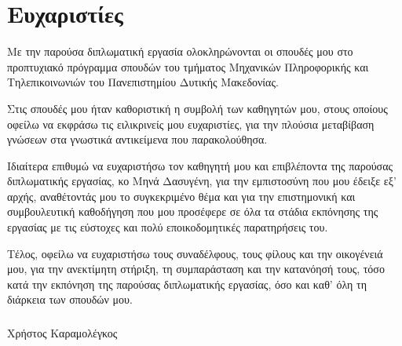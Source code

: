 \chapter*{Ευχαριστίες}
Με την παρούσα διπλωματική εργασία ολοκληρώνονται οι σπουδές μου στο προπτυχιακό πρόγραμμα σπουδών του τμήματος Μηχανικών Πληροφορικής και Τηλεπικοινωνιών του Πανεπιστημίου Δυτικής Μακεδονίας.

Στις σπουδές μου ήταν καθοριστική η συμβολή των καθηγητών μου, στους οποίους οφείλω να εκφράσω τις ειλικρινείς μου ευχαριστίες, για την πλούσια μεταβίβαση γνώσεων στα γνωστικά αντικείμενα που παρακολούθησα.

Ιδιαίτερα επιθυμώ να ευχαριστήσω τον καθηγητή μου και επιβλέποντα της παρούσας διπλωματικής εργασίας, κο Μηνά Δασυγένη, για την
εμπιστοσύνη που μου έδειξε εξ’ αρχής, αναθέτοντάς μου το συγκεκριμένο θέμα και για την επιστημονική και συμβουλευτική καθοδήγηση που μου προσέφερε σε όλα τα στάδια εκπόνησης της εργασίας με τις εύστοχες και πολύ εποικοδομητικές παρατηρήσεις του.

Τέλος, οφείλω να ευχαριστήσω τους συναδέλφους, τους φίλους και την οικογένειά μου, για την ανεκτίμητη στήριξη, τη συμπαράσταση και την κατανόησή τους, τόσο κατά την εκπόνηση της παρούσας διπλωματικής εργασίας, όσο και καθ' όλη τη διάρκεια των σπουδών μου.

\paragraph*{}
\hfill Χρήστος Καραμολέγκος